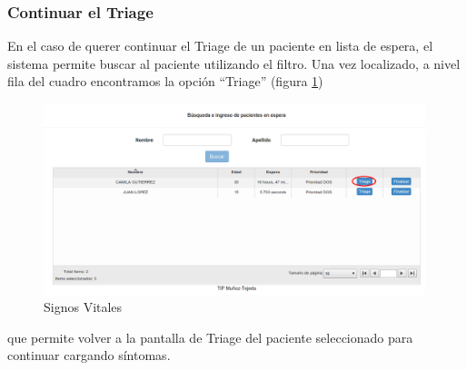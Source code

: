 \subsubsection{Continuar el Triage}
En el caso de querer continuar el Triage de un paciente en lista de espera, el sistema permite buscar al paciente utilizando el filtro. Una vez localizado, a nivel fila del cuadro encontramos la opción ``Triage'' (figura \ref{fig:espera1})
\begin{figure}
\centerline{\includegraphics[width=0.99\textwidth]{espera1.png}}
\caption{Signos Vitales} \label{fig:espera1}
\end{figure}
que permite volver a la pantalla de Triage del paciente seleccionado para continuar cargando síntomas.
